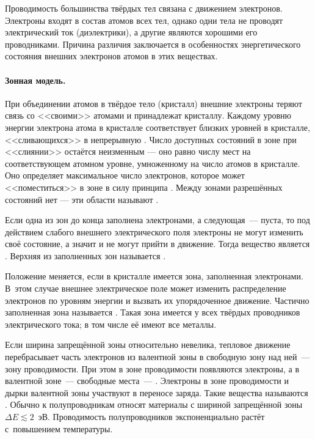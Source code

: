 
Проводимость большинства твёрдых тел связана с движением электронов. Электроны
входят в состав атомов всех тел, однако одни тела не проводят электрический ток
(диэлектрики), а другие являются хорошими его проводниками. Причина различия
заключается в особенностях энергетического состояния внешних электронов атомов в
этих веществах.

\paragraph{Зонная модель.}
При объединении атомов в твёрдое тело (кристалл) внешние электроны теряют связь
со <<своими>> атомами и принадлежат  кристаллу.
Каждому уровню энергии электрона  атома в кристалле
соответствует  близких уровней в кристалле,
<<сливающихся>> в непрерывную .
Число доступных состояний в зоне при <<слиянии>> остаётся неизменным --- оно
равно числу мест на соответствующем атомном уровне,
умноженному на число атомов в кристалле. Оно определяет максимальное число
электронов, которое может <<поместиться>> в зоне в силу принципа
. Между зонами разрешённых состояний нет ---
эти области называют .

Если одна из зон до конца заполнена электронами, а следующая~---
пуста, то под действием слабого внешнего электрического поля
электроны не могут изменить своё состояние, а значит и не могут
прийти в движение. Тогда вещество является .
Верхняя из заполненных зон называется .

Положение меняется, если в кристалле имеется зона, 
заполненная
электронами. В~этом случае внешнее электрическое поле может изменить
распределение электронов по уровням энергии и вызвать их упорядоченное движение.
Частично заполненная зона называется .
Такая зона имеется у всех твёрдых проводников электрического тока;
в том числе её имеют все металлы.

Если ширина запрещённой зоны относительно невелика, тепловое движение
перебрасывает часть электронов из валентной зоны в свободную зону над ней~---
зону проводимости. При этом в зоне проводимости появляются электроны,
а в валентной зоне~--- свободные места~--- .
Электроны в зоне проводимости и дырки валентной зоны участвуют в переносе
заряда.
Такие вещества называются .
Обычно к полупроводникам относят материалы с шириной запрещённой зоны $\Delta E
\lesssim 2$~эВ. Проводимость полупроводников экспоненциально растёт с~повышением
температуры.

